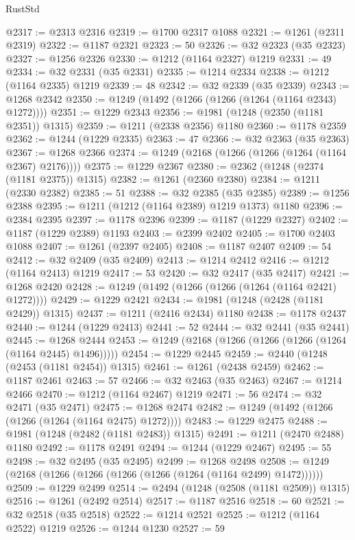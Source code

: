 \begin{lexlean}{RustStd}
\begin{coremodule}
{\begin{coremodule}
{{{{{{{{{{{{{{{{{{{{{{{{{{{{{{{{@2317 := @2313 @2316
@2319 := @1700 @2317 @1088
@2321 := @1261 (@2311 @2319)
@2322 := @1187 @2321
@2323 := 50
@2326 := @32 @2323 (@35 @2323)
@2327 := @1256 @2326
@2330 := @1212 (@1164 @2327) @1219
@2331 := 49
@2334 := @32 @2331 (@35 @2331)
@2335 := @1214 @2334
@2338 := @1212 (@1164 @2335) @1219
@2339 := 48
@2342 := @32 @2339 (@35 @2339)
@2343 := @1268 @2342
@2350 := @1249 (@1492 (@1266 (@1266 (@1264 (@1164 @2343) @1272))))
@2351 := @1229 @2343
@2356 := @1981 (@1248 (@2350 (@1181 @2351)) @1315)
@2359 := @1211 (@2338 @2356) @1180
@2360 := @1178 @2359
@2362 := @1244 (@1229 @2335)
@2363 := 47
@2366 := @32 @2363 (@35 @2363)
@2367 := @1268 @2366
@2374 := @1249 (@2168 (@1266 (@1266 (@1264 (@1164 @2367) @2176))))
@2375 := @1229 @2367
@2380 := @2362 (@1248 (@2374 (@1181 @2375)) @1315)
@2382 := @1261 (@2360 @2380)
@2384 := @1211 (@2330 @2382)
@2385 := 51
@2388 := @32 @2385 (@35 @2385)
@2389 := @1256 @2388
@2395 := @1211 (@1212 (@1164 @2389) @1219 @1373) @1180
@2396 := @2384 @2395
@2397 := @1178 @2396
@2399 := @1187 (@1229 @2327)
@2402 := @1187 (@1229 @2389) @1193
@2403 := @2399 @2402
@2405 := @1700 @2403 @1088
@2407 := @1261 (@2397 @2405)
@2408 := @1187 @2407
@2409 := 54
@2412 := @32 @2409 (@35 @2409)
@2413 := @1214 @2412
@2416 := @1212 (@1164 @2413) @1219
@2417 := 53
@2420 := @32 @2417 (@35 @2417)
@2421 := @1268 @2420
@2428 := @1249 (@1492 (@1266 (@1266 (@1264 (@1164 @2421) @1272))))
@2429 := @1229 @2421
@2434 := @1981 (@1248 (@2428 (@1181 @2429)) @1315)
@2437 := @1211 (@2416 @2434) @1180
@2438 := @1178 @2437
@2440 := @1244 (@1229 @2413)
@2441 := 52
@2444 := @32 @2441 (@35 @2441)
@2445 := @1268 @2444
@2453 := @1249 (@2168 (@1266 (@1266 (@1266 (@1264 (@1164 @2445) @1496)))))
@2454 := @1229 @2445
@2459 := @2440 (@1248 (@2453 (@1181 @2454)) @1315)
@2461 := @1261 (@2438 @2459)
@2462 := @1187 @2461
@2463 := 57
@2466 := @32 @2463 (@35 @2463)
@2467 := @1214 @2466
@2470 := @1212 (@1164 @2467) @1219
@2471 := 56
@2474 := @32 @2471 (@35 @2471)
@2475 := @1268 @2474
@2482 := @1249 (@1492 (@1266 (@1266 (@1264 (@1164 @2475) @1272))))
@2483 := @1229 @2475
@2488 := @1981 (@1248 (@2482 (@1181 @2483)) @1315)
@2491 := @1211 (@2470 @2488) @1180
@2492 := @1178 @2491
@2494 := @1244 (@1229 @2467)
@2495 := 55
@2498 := @32 @2495 (@35 @2495)
@2499 := @1268 @2498
@2508 := @1249 (@2168 (@1266 (@1266 (@1266 (@1266 (@1264 (@1164 @2499) @1472))))))
@2509 := @1229 @2499
@2514 := @2494 (@1248 (@2508 (@1181 @2509)) @1315)
@2516 := @1261 (@2492 @2514)
@2517 := @1187 @2516
@2518 := 60
@2521 := @32 @2518 (@35 @2518)
@2522 := @1214 @2521
@2525 := @1212 (@1164 @2522) @1219
@2526 := @1244 @1230
@2527 := 59
}}}}}}}}}}}}}}}}}}}}}}}}}}}}}}}}
\end{coremodule}}
\end{coremodule}
\end{lexlean}
